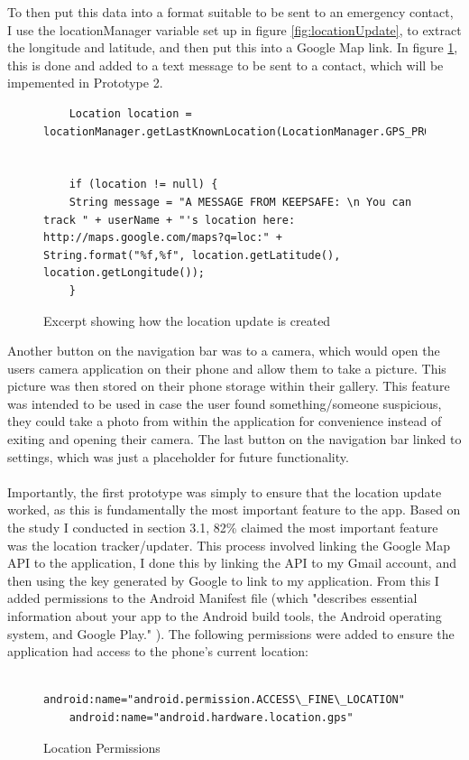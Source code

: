 \documentclass[a4paper]{report}
\begin{document}
To then put this data into a format suitable to be sent to an emergency contact, I use the locationManager variable set up in figure \ref{fig:locationUpdate}, to extract the longitude and latitude, and then put this into a Google Map link. In figure \ref{fig:messageLocation}, this is done and added to a text message to be sent to a contact, which will be impemented in Prototype 2.\\
\begin{figure}[H]
\singlespacing
	\begin{lstlisting}
	Location location = locationManager.getLastKnownLocation(LocationManager.GPS_PROVIDER);
	
	
	if (location != null) {
	String message = "A MESSAGE FROM KEEPSAFE: \n You can track " + userName + "'s location here: http://maps.google.com/maps?q=loc:" + String.format("%f,%f", location.getLatitude(), location.getLongitude());
	}
	\end{lstlisting}
	\caption{Excerpt showing how the location update is created}
		\label{fig:messageLocation}
\end{figure}
Another button on the navigation bar was to a camera, which would open the users camera application on their phone and allow them to take a picture. This picture was then stored on their phone storage within their gallery. This feature was intended to be used in case the user found something/someone suspicious, they could take a photo from within the application for convenience instead of exiting and opening their camera. The last button on the navigation bar linked to settings, which was just a placeholder for future functionality. \\
\\ Importantly, the first prototype was simply to ensure that the location update worked, as this is fundamentally the most important feature to the app. Based on the study I conducted in section 3.1, 82\% claimed the most important feature was the location tracker/updater. This process involved linking the Google Map API to the application, I done this by linking the API to my Gmail account, and then using the key generated by Google to link to my application. From this I added permissions to the Android Manifest file (which "describes essential information about your app to the Android build tools, the Android operating system, and Google Play." \cite{manifest}). The following permissions were added to ensure the application had access to the phone's current location:   \\
\begin{figure}[H]
	\singlespacing
\begin{lstlisting}
	android:name="android.permission.ACCESS\_FINE\_LOCATION"
	android:name="android.hardware.location.gps"
\end{lstlisting}
\caption{Location Permissions}
\label{fig:LocPer}
\end{figure}
\end{document}
